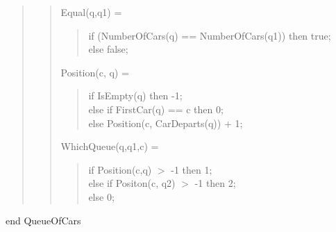 \documentclass[letterpaper,12pt]{article}
\begin{document}
\begin{quote}
\begin{quote}
  Equal(q,q1) =
  \begin{quote}
   if (NumberOfCars(q) == NumberOfCars(q1)) then true;\\
   else false;
  \end{quote}
  Position(c, q) =
  \begin{quote}
   if IsEmpty(q) then -1;\\
   else if FirstCar(q) == c then 0;\\
   else Position(c, CarDeparts(q)) + 1;
  \end{quote}
  WhichQueue(q,q1,c) =
  \begin{quote}
   if Position(c,q) $>$ -1 then 1;\\
   else if Positon(c, q2) $>$ -1 then 2;\\
   else 0;
  \end{quote}
  
  
 \end{quote}
 
\end{quote}
end QueueOfCars
\end{document}
